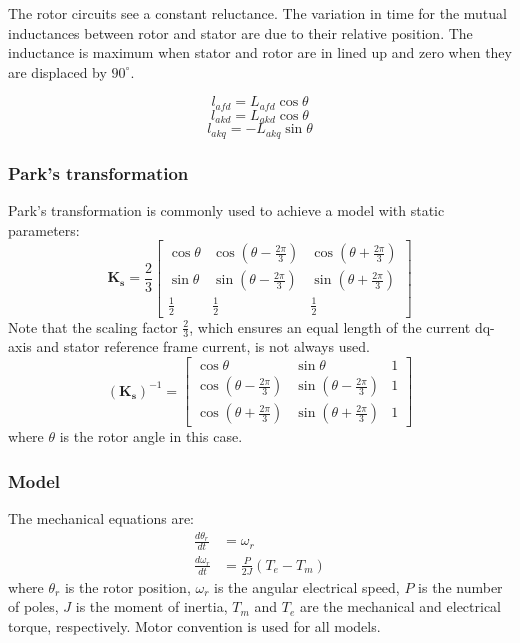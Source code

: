The rotor circuits see a constant reluctance. The variation in time for the mutual inductances between rotor and stator are due to their relative position. The inductance is maximum when stator and rotor are in lined up and zero when they are displaced by $90^{\circ}$.

\begin{equation}
	l_{afd} = L_{afd} \cos \theta
\end{equation}
\begin{equation}
	l_{akd} = L_{akd} \cos \theta
\end{equation}
\begin{equation}
	l_{akq} = -L_{akq} \sin \theta
\end{equation}

\subsubsection{Park's transformation}

Park's transformation is commonly used to achieve a model with static parameters:
%
\begin{equation}
\mathbf{K_s} = \frac{2}{3}
 \begin{bmatrix} 
  \cos \theta & \cos(\theta-\frac{2\pi}{3}) & \cos(\theta+\frac{2\pi}{3}) \\
  \sin \theta & \sin(\theta-\frac{2\pi}{3}) & \sin(\theta+\frac{2\pi}{3}) \\
  \frac{1}{2} & \frac{1}{2} & \frac{1}{2}
 \end{bmatrix}
\end{equation}
%
Note that the scaling factor $\frac{2}{3}$, which ensures an equal length of the current dq-axis and stator reference frame current, is not always used. 
%
\begin{equation}
(\mathbf{K_s})^{-1} = 
 \begin{bmatrix} 
  \cos \theta & \sin \theta & 1 \\
  \cos(\theta-\frac{2\pi}{3}) & \sin(\theta-\frac{2\pi}{3}) & 1 \\
  \cos(\theta+\frac{2\pi}{3}) & \sin(\theta+\frac{2\pi}{3}) & 1
 \end{bmatrix}
\end{equation}
%
where $\theta$ is the rotor angle in this case.

\subsubsection{Model}

The mechanical equations are:
%
\begin{align}
\frac{d\theta_r}{dt} &= \omega_r \label{eq:d_theta} \\
\frac{d\omega_r}{dt} &= \frac{P}{2J} (T_e-T_m) \label{eq:d_omega}
\end{align}
%
where $\theta_r$ is the rotor position, $\omega_r$ is the angular electrical speed, $P$ is the number of poles, $J$ is the moment of inertia, $T_m$ and $T_e$ are the mechanical and electrical torque, respectively. Motor convention is used for all models. 

